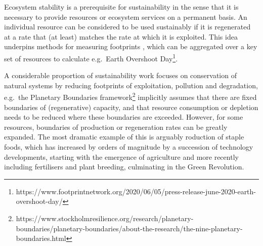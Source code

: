 \documentclass[conference]{IEEEtran}
\begin{document}

Ecosystem stability is a prerequisite for sustainability in the sense
that it is necessary to provide resources or ecosystem services on a
permanent basis. An individual resource can be considered to be used
sustainably if it is regenerated at a rate that (at least) matches the
rate at which it is exploited. This idea underpins methods for
measuring footprints \cite{Wackernagel2019_defyingthefootprintoracle},
which can be aggregated over a key set of resources to calculate e.g.\
Earth Overshoot
Day\footnote{https://www.footprintnetwork.org/2020/06/05/press-release-june-2020-earth-overshoot-day/}.

A considerable proportion of sustainability work focuses on
conservation of natural systems by reducing footprints of
exploitation, pollution and degradation, e.g.\ the Planetary
Boundaries
framework\footnote{https://www.stockholmresilience.org/research/planetary-boundaries/planetary-boundaries/about-the-research/the-nine-planetary-boundaries.html}
implicitly assumes that there are fixed boundaries of (regenerative)
capacity, and that resource consumption or depletion needs to be
reduced where these boundaries are exceeded. However, for some
resources, boundaries of production or regeneration rates can be
greatly expanded. The most dramatic example of this is arguably
roduction of staple foods, which has increased by orders of magnitude
by a succession of technology developments, starting with the
emergence of agriculture and more recently including fertilisers and
plant breeding, culminating in the Green Revolution.



\end{document}
